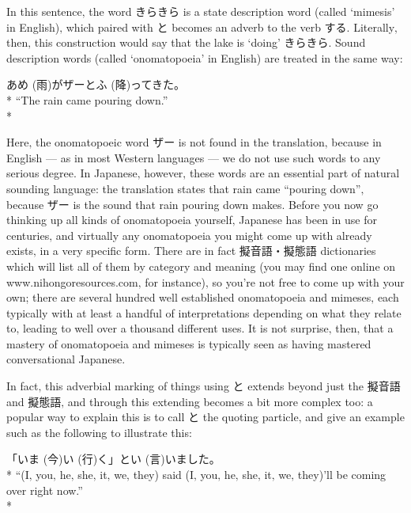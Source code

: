 \documentclass[11pt, b5paper, twoside, openright, onecolumn]{book}
\makeatletter
\newcommand*{\rubystack}[2]{{\relscale{0.5}%
  \begin{tabular}[b]{@{}c@{}}%
    {#1}\\%
   {\textscale{2}{#2}}%
  \end{tabular}}%
}
\DeclareRobustCommand*{\ruby}[2]{%
  \mbox{%
    \setlength{\parskip}{0ex}%
    \BeginAccSupp{method=pdfstringdef,ActualText={#1}}%
      \rubystack{\phantom{#2}}{#1}%
      \llap{%
        \rubystack{#2}{\phantom{#1}}%
      }%
    \EndAccSupp{}%
  }%
}
\renewcommand*{\ruby}[2]{#2 (#1)}%
\newenvironment{exampleblock}{
\setlength{\parindent}{0.6in}
\begin{minipage}[t]{\dimexpr\textwidth-\parindent}}
{\end{minipage}}
\makeatother
\begin{document}
In this sentence‚ the word きらきら is a state description word (called ‘mimesis’ in English)‚ which paired with と becomes an adverb to the verb する. Literally‚ then‚ this construction would say that the lake is ‘doing’ きらきら. Sound description words (called ‘onomatopoeia’ in English) are treated in the same way:

\vspace{0.4cm}
\begin{exampleblock}
\ruby{雨}{あめ}がザーと\ruby{降}{ふ}ってきた。 \\* 
“The rain came pouring down.” \\* 
\end{exampleblock}
\vspace{0.2cm}

Here‚ the onomatopoeic word ザー is not found in the translation‚ because in English — as in most Western languages — we do not use such words to any serious degree. In Japanese‚ however‚ these words are an essential part of natural sounding language: the translation states that rain came “pouring down”‚ because ザー is the sound that rain pouring down makes. Before you now go thinking up all kinds of onomatopoeia yourself‚ Japanese has been in use for centuries‚ and virtually any onomatopoeia you might come up with already exists‚ in a very specific form. There are in fact 擬音語・擬態語 dictionaries which will list all of them by category and meaning (you may find one online on www.nihongoresources.com‚ for instance)‚ so you’re not free to come up with your own; there are several hundred well established onomatopoeia and mimeses‚ each typically with at least a handful of interpretations depending on what they relate to‚ leading to well over a thousand different uses. It is not surprise‚ then‚ that a mastery of onomatopoeia and mimeses is typically seen as having mastered conversational Japanese.

In fact‚ this adverbial marking of things using と extends beyond just the 擬音語 and 擬態語‚ and through this extending becomes a bit more complex too: a popular way to explain this is to call と the quoting particle‚ and give an example such as the following to illustrate this:

\vspace{0.4cm}
\begin{exampleblock}
「\ruby{今}{いま}\ruby{行}{い}く」と\ruby{言}{い}いました。 \\* 
“(I‚ you‚ he‚ she‚ it‚ we‚ they) said (I‚ you‚ he‚ she‚ it‚ we‚ they)’ll be coming over right now.” \\* 
\end{exampleblock}
\vspace{0.2cm}
\end{document}
